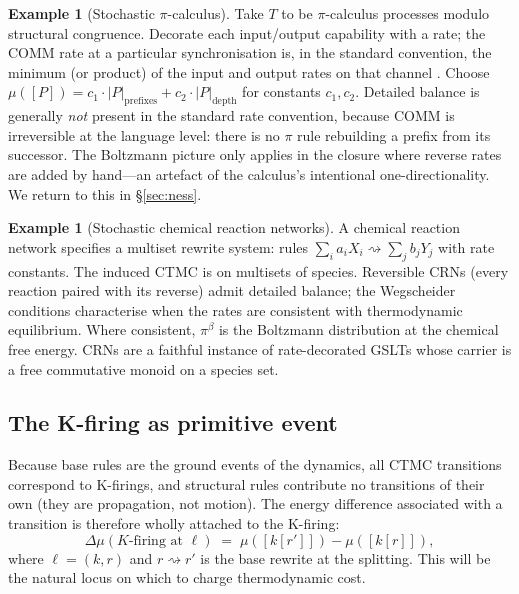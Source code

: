 \documentclass[11pt]{article}
\theoremstyle{plain}
\theoremstyle{definition}
\newtheorem{example}[theorem]{Example}
\theoremstyle{remark}
\newcommand{\rew}{\rightsquigarrow}
\begin{document}
\begin{example}[Stochastic $\pi$-calculus]\label{ex:stochpi}
Take $T$ to be $\pi$-calculus processes modulo structural congruence. Decorate each input/output capability with a rate; the COMM rate at a particular synchronisation is, in the standard convention, the minimum (or product) of the input and output rates on that channel \cite{Priami95}. Choose $\mu([P]) = c_1 \cdot |P|_{\mathrm{prefixes}} + c_2 \cdot |P|_{\mathrm{depth}}$ for constants $c_1, c_2$. Detailed balance is generally \emph{not} present in the standard rate convention, because COMM is irreversible at the language level: there is no $\pi$ rule rebuilding a prefix from its successor. The Boltzmann picture only applies in the closure where reverse rates are added by hand---an artefact of the calculus's intentional one-directionality. We return to this in \S\ref{sec:ness}.
\end{example}

\begin{example}[Stochastic chemical reaction networks]\label{ex:crn}
A chemical reaction network specifies a multiset rewrite system: rules $\sum_i a_i X_i \rew \sum_j b_j Y_j$ with rate constants. The induced CTMC is on multisets of species. Reversible CRNs (every reaction paired with its reverse) admit detailed balance; the Wegscheider conditions \cite{Feinberg19,AndersonKurtz15} characterise when the rates are consistent with thermodynamic equilibrium. Where consistent, $\pi^\beta$ is the Boltzmann distribution at the chemical free energy. CRNs are a faithful instance of rate-decorated GSLTs whose carrier is a free commutative monoid on a species set.
\end{example}

\subsection{The K-firing as primitive event}

Because base rules are the ground events of the dynamics, all CTMC transitions correspond to K-firings, and structural rules contribute no transitions of their own (they are propagation, not motion). The energy difference associated with a transition is therefore wholly attached to the K-firing:
\begin{equation}\label{eq:efiring}
\Delta\mu(K\text{-firing at } \ell) \;=\; \mu([k[r']]) - \mu([k[r]]),
\end{equation}
where $\ell = (k, r)$ and $r \rew r'$ is the base rewrite at the splitting. This will be the natural locus on which to charge thermodynamic cost.
\end{document}
